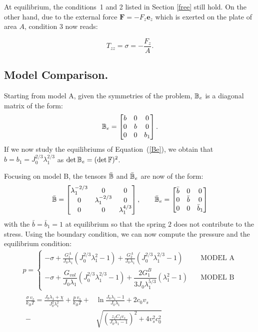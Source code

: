 At equilibrium, the conditions~1 and 2 listed in Section \ref{free} still hold. On the other hand, due to the external force $\mathbf{F}= -F_z \mathbf{e}_z$ which is exerted on the plate of area $A$, condition 3 now reads:

\begin{equation}
T_{zz}=\sigma = -\frac{F_z}{A}.
\end{equation} 

\subsection{Model Comparison.}
\label{data}
Starting from model A, given the symmetries of the problem, $\mathbb{B}_e$ is a diagonal matrix of the form:
\begin{equation}
\mathbb{B}_e=\begin{bmatrix}
b &0&0\\
0&b&0\\
0&0& b_1
\end{bmatrix}. 
\end{equation}
If we now study the equilibriums of Equation~(\ref{Be}), we obtain that $b=b_1=J_0^{2/3}\lambda_1^{2/3}$ as $\det \mathbb{B}_e= (\det \mathbb{F})^2$.

Focusing on model B, the tensors $\bar{\mathbb{B}}$ and $\bar{\mathbb{B}}_e$ are now of the form:
\begin{equation}
\bar{\mathbb{B}}=\begin{bmatrix}
\lambda_1^{-2/3} &0&0\\
0&\lambda_1^{-2/3}&0\\
0&0& \lambda_1^{4/3}
\end{bmatrix}, \qquad
\bar{\mathbb{B}}_e=\begin{bmatrix}
\bar{b} &0&0\\
0&\bar{b}&0\\
0&0& \bar{b}_1
\end{bmatrix}
\end{equation}
with the $\bar{b}=\bar{b}_1=1$ at equilibrium so that the spring $2$ does not contribute to the stress. Using the boundary condition, we can now compute the pressure and the equilibrium condition:
\begin{gather}
p = \begin{cases}
\displaystyle
-\sigma + \frac{G^A_1}{J_0\lambda_1} (J^{2/3}_0\lambda_1^2-1)+\frac{G^A_2}{J_0\lambda_1} (J_0^{2/3} \lambda_1^{2/3}-1) &\quad \text{MODEL A} \\[10pt]
-\sigma + \dfrac{G_{vol}}{J_0\lambda_1}(J_0^{2/3}\lambda_1^{2/3}-1)+\dfrac{2G^B_1}{3J_0\lambda_1^{5/3}} (\lambda_1^2-1) &\quad \text{MODEL B}
\end{cases}\\[10pt]
\begin{aligned}
\frac{\sigma\  v_s}{k_B T}=\frac{J_0\lambda_1+\chi}{J_0^2\lambda^2_1}+\frac{p\ v_s}{k_B T}+&\ln \frac{J_0\lambda_1-1}{J_0\lambda_1} +2c_0v_s\\
-\ &\sqrt{\left(\frac{z_fC_fv_s}{J_0\lambda_1-1}\right)^2+4v_s^2c^2_0}
\end{aligned}\label{compA}
\end{gather}


